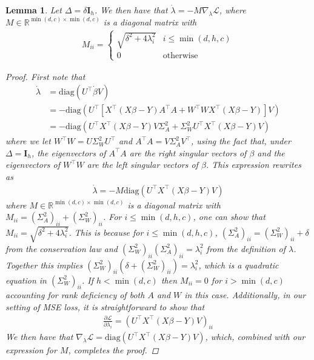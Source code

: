 \documentclass{article}
\theoremstyle{plain}
\newtheorem{lemma}[theorem]{Lemma}
\theoremstyle{definition}
\theoremstyle{remark}
\begin{document}
\begin{lemma}
\label{lemma:mirror-singular}
Let $\Delta = \delta \mathbf{I}_h$. We then have that $\dot{\lambda} = -M \nabla_\lambda \mathcal{L}$, where $M \in \mathbb{R}^{\min(d, c) \times \min(d, c)}$ is a diagonal matrix with
\begin{align}
    M_{ii} = \begin{cases}
        \sqrt{\delta^2 + 4 \lambda_{i}^2} & i \leq \min(d, h, c) \\
        0 & \mathrm{otherwise}
    \end{cases}
\end{align}
\begin{proof}
First note that
\begin{align}
    \dot{\lambda} &= \mathrm{diag}(U^\intercal \dot{\beta}V)\\
    &= -\mathrm{diag}\left(U^\intercal \left[ X^\intercal (X\beta - Y)A^\intercal A + W^\intercal W X^\intercal (X\beta - Y) \right]V\right)\\
    &= -\mathrm{diag}\left(U^\intercal X^\intercal (X\beta - Y)V\Sigma_A^2 + \Sigma_W^2 U^\intercal X^\intercal (X\beta - Y)V \right)
\end{align}
where we let $W^\intercal W = U \Sigma_W^2 U^\intercal$ and $A^\intercal A = V \Sigma_A^2 V^\intercal$, using the fact that, under $\Delta = \mathbf{I}_h$, the eigenvectors of $A^\intercal A$ are the right singular vectors of $\beta$ and the eigenvectors of $W^\intercal W$ are the left singular vectors of $\beta$. This expression rewrites as
\begin{align}
    \dot{\lambda} = -M \mathrm{diag} \left( U^\intercal X^\intercal (X\beta - Y)V \right)
\end{align}
where $M \in \mathbb{R}^{\min(d, c) \times \min(d, c)}$ is a diagonal matrix with $M_{ii} = (\Sigma_A^2)_{ii} + (\Sigma_{W}^2)_{ii}$.
%
For $i \leq \min(d, h, c)$, one can show that $M_{ii} = \sqrt{\delta^2 + 4 \lambda_{i}^2}$.
%
This is because for $i \leq \min(d, h, c)$, $(\Sigma_{A}^2)_{ii} = (\Sigma_{W}^2)_{ii} + \delta$ from the conservation law and $(\Sigma_{W}^2)_{ii}(\Sigma_{A}^2)_{ii} =  \lambda_i^2$ from the definition of $\lambda$.
%
Together this implies $(\Sigma_{W}^2)_{ii}\left(\delta + (\Sigma_{W}^2)_{ii} \right) = \lambda_{i}^2$, which is a quadratic equation in $(\Sigma_{W}^2)_{ii}$.
%
If $h < \min(d, c)$ then $M_{ii} = 0$ for $i > \min(d, c)$ accounting for rank deficiency of both $A$ and $W$ in this case.
%
Additionally, in our setting of MSE loss, it is straightforward to show that
\begin{align}
    \frac{\partial \mathcal{L}}{\partial \lambda_i} = \left(U^\intercal X^\intercal (X\beta - Y) V\right)_{ii}
\end{align}
We then have that $\nabla_\lambda \mathcal{L} = \mathrm{diag}\left(U^\intercal X^\intercal (X\beta - Y) V \right)$, which, combined with our expression for $M$, completes the proof.
\end{proof}
\end{lemma}
\end{document}
